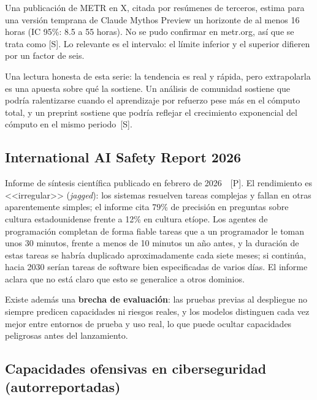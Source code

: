\documentclass[10pt]{article}
\newcommand{\tP}{\textsf{\small[P]}}
\newcommand{\tS}{\textsf{\small[S]}}
\begin{document}
Una publicaci\'on de METR en X, citada por res\'umenes de terceros, estima para una versi\'on temprana de Claude Mythos Preview un horizonte de al menos 16 horas (IC 95\%: 8.5 a 55 horas). No se pudo confirmar en metr.org, as\'i que se trata como \tS. Lo relevante es el intervalo: el l\'imite inferior y el superior difieren por un factor de seis.

Una lectura honesta de esta serie: la tendencia es real y r\'apida, pero extrapolarla es una apuesta sobre qu\'e la sostiene. Un an\'alisis de comunidad sostiene que podr\'ia ralentizarse cuando el aprendizaje por refuerzo pese m\'as en el c\'omputo total, y un preprint sostiene que podr\'ia reflejar el crecimiento exponencial del c\'omputo en el mismo periodo~\tS.

\subsection{International AI Safety Report 2026}

Informe de s\'intesis cient\'ifica publicado en febrero de 2026~\cite{iasr2026}~\tP. El rendimiento es <<irregular>> (\emph{jagged}): los sistemas resuelven tareas complejas y fallan en otras aparentemente simples; el informe cita 79\% de precisi\'on en preguntas sobre cultura estadounidense frente a 12\% en cultura et\'iope. Los agentes de programaci\'on completan de forma fiable tareas que a un programador le toman unos 30 minutos, frente a menos de 10 minutos un a\~no antes, y la duraci\'on de estas tareas se habr\'ia duplicado aproximadamente cada siete meses; si contin\'ua, hacia 2030 ser\'ian tareas de software bien especificadas de varios d\'ias. El informe aclara que no est\'a claro que esto se generalice a otros dominios.

Existe adem\'as una \textbf{brecha de evaluaci\'on}: las pruebas previas al despliegue no siempre predicen capacidades ni riesgos reales, y los modelos distinguen cada vez mejor entre entornos de prueba y uso real, lo que puede ocultar capacidades peligrosas antes del lanzamiento.

\subsection{Capacidades ofensivas en ciberseguridad (autorreportadas)}
\end{document}
